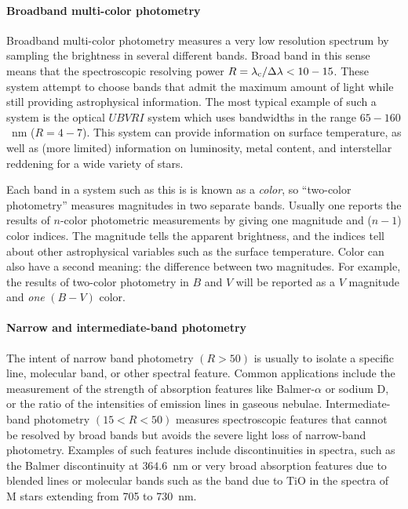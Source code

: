 \documentclass{article}
\begin{document}
\paragraph{Broadband multi-color photometry} Broadband multi-color
photometry measures a very low resolution spectrum by sampling the
brightness in several different bands. Broad band in this sense means
that the spectroscopic resolving power $R={\lambda_{\rm c}/\Delta
\lambda} < 10-15$. These system attempt to choose bands that admit the
maximum amount of light while still providing astrophysical
information. The most typical example of such a system is the optical $UBVRI$
system which uses bandwidths in the range $65-160$~nm ($R=4-7$). This
system can provide information on surface temperature, as well as
(more limited) information on luminosity, metal content, and
interstellar reddening for a wide variety of stars. 

Each band in a system such as this is is known as a {\it color}, so
``two-color photometry'' measures magnitudes in two separate
bands. Usually one reports the results of $n$-color photometric
measurements by giving one magnitude and ($n-1$) color indices. The
magnitude tells the apparent brightness, and the indices tell about
other astrophysical variables such as the surface temperature. Color
can also have a second meaning: the difference between two
magnitudes. For example, the results of two-color photometry in $B$ and
$V$ will be reported as a $V$ magnitude and {\it one} $(B-V)$ color.
\paragraph{Narrow and intermediate-band photometry} The intent of
narrow band photometry $(R>50)$ is usually to isolate a specific line,
molecular band, or other spectral feature. Common applications include
the measurement of the strength of absorption features like
Balmer-$\alpha$ or sodium D, or the ratio of the intensities of
emission lines in gaseous nebulae. Intermediate-band photometry
$(15<R<50)$ measures spectroscopic features that cannot be resolved by
broad bands but avoids the severe light loss of narrow-band
photometry. Examples of such features include discontinuities in
spectra, such as the Balmer discontinuity at $364.6$~nm or very broad
absorption features due to blended lines or molecular bands such as
the band due to TiO in the spectra of M stars extending from 705 to
730~nm.
\end{document}
